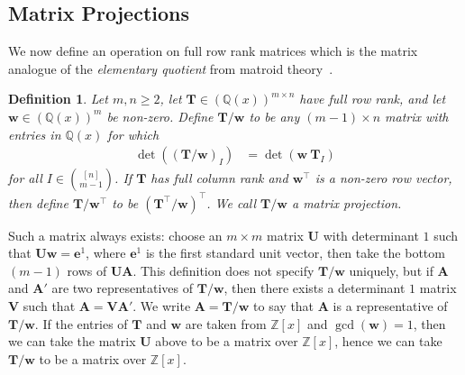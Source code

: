 \documentclass[a4paper, 11pt]{article}
\newcommand{\Z}{\mathbb{Z}}
\newcommand{\bA}{\bm{A}}
\newcommand{\be}{\bm{e}}
\newcommand{\bw}{\bm{w}}
\newcommand{\bT}{\bm{T}}
\newcommand{\bU}{\bm{U}}
\newcommand{\bV}{\bm{V}}
\newcommand{\indet}{x}
\newcommand{\polyring}{\Z[\indet]}
\newtheorem{definition}{Definition}
\begin{document}
	
\subsection{Matrix Projections}\label{sec_matrix_projections}

We now define an operation on full row rank matrices which is the matrix analogue of the \emph{elementary quotient} from matroid theory~\cite[p. 272]{oxley2011matroid}.

\begin{definition}
Let $m,n\geq 2$, let $\bT\in(\mathbb{Q}(x))^{m\times n}$ have full row rank, and let $\bw\in (\mathbb{Q}(x))^{m}$ be non-zero. Define $\bT/\bw$ to be any $(m-1)\times n$
matrix with entries in $\mathbb{Q}(x)$ for which
\begin{align*}
\det((\bT/\bw)_{I}) & =\det(\bw\ \bT_{I})
\end{align*}
for all $I\in\binom{\left[n\right]}{m-1}$. If $\bT$ has full column rank and $\bw^\top$ is a non-zero row vector, then define $\bT/\bw^\top$ to be $(\bT^\top/\bw)^\top$. We call $\bT/\bw$ a \emph{matrix projection}.
\end{definition} 

Such a matrix always exists: choose an $m\times m$ matrix $\bU$ with determinant $1$ such that $\bU\bw=\be^1$, where $\be^1$ is the first standard unit vector, then take the bottom $(m-1)$ rows of $\bU\bA$. This definition does not specify $\bT/\bw$ uniquely, but if $\bA$ and $\bA'$ are two representatives of $\bT/\bw$, then there exists a determinant $1$ matrix $\bV$ such that $\bA=\bV\bA'$. We write $\bA=\bT/\bw$ to say that $\bA$ is a representative of $\bT/\bw$. 
If the entries of $\bT$ and $\bw$ are taken from $\polyring$ and $\gcd(\bw)=1$, then we can take the matrix $\bU$ above to be a matrix over $\polyring$, hence we can take $\bT/\bw$ to be a matrix over $\polyring$.
    
\end{document}
